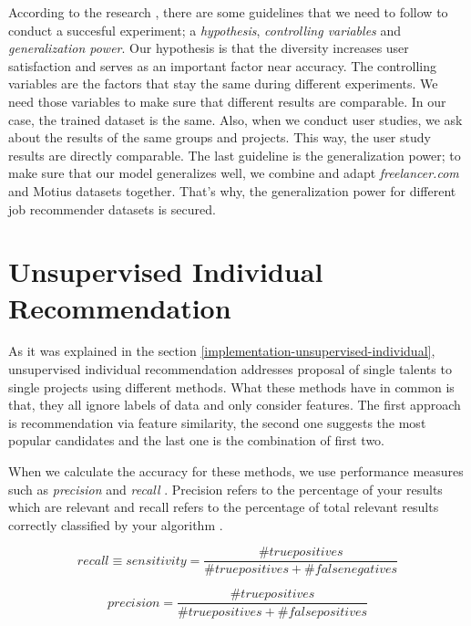 According to the research \cite{shani2011evaluating}, there are some guidelines that we need to follow to conduct a succesful experiment; a \textit{hypothesis}, \textit{controlling variables} and \textit{generalization power}. Our hypothesis is that the diversity increases user satisfaction and serves as an important factor near accuracy. The controlling variables are the factors that stay the same during different experiments. We need those variables to make sure that different results are comparable. In our case, the trained dataset is the same. Also, when we conduct user studies, we ask about the results of the same groups and projects. This way, the user study results are directly comparable. The last guideline is the generalization power; to make sure that our model generalizes well, we combine and adapt \textit{freelancer.com} and Motius datasets together. That's why, the generalization power for different job recommender datasets is secured. 


\section{Unsupervised Individual Recommendation}

As it was explained in the section \ref{implementation-unsupervised-individual}, unsupervised individual recommendation addresses proposal of single talents to single projects using different methods. What these methods have in common is that, they all ignore labels of data and only consider features. The first approach is recommendation via feature similarity, the second one suggests the most popular candidates and the last one is the combination of first two.

When we calculate the accuracy for these methods, we use performance measures such as \textit{precision} and \textit{recall} \cite{burke2015robust}. Precision refers to the percentage of your results which are relevant and recall refers to the percentage of total relevant results correctly classified by your algorithm \cite{davis2006relationship}.

\begin{equation}
recall \equiv  sensitivity =\frac{\#  true positives }{\# true positives +\# false negatives }
\end{equation}

\begin{equation}
precision =\frac{\#true positives }{\# true positives +\#  false positives }
\end{equation}

